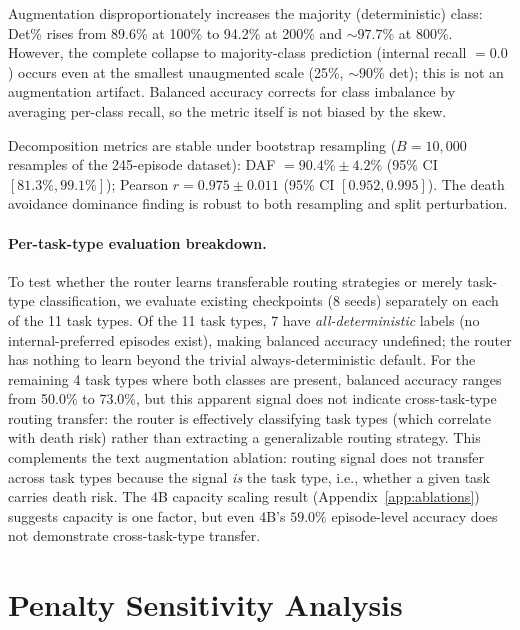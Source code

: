 \documentclass[11pt]{article}
\begin{document}
Augmentation disproportionately increases the majority (deterministic) class: Det\% rises from 89.6\% at 100\% to 94.2\% at 200\% and ${\sim}97.7\%$ at 800\%. However, the complete collapse to majority-class prediction (internal recall $= 0.0$) occurs even at the smallest unaugmented scale (25\%, ${\sim}90\%$ det); this is not an augmentation artifact. Balanced accuracy corrects for class imbalance by averaging per-class recall, so the metric itself is not biased by the skew.

Decomposition metrics are stable under bootstrap resampling ($B{=}10{,}000$ resamples of the 245-episode dataset): DAF $= 90.4\% \pm 4.2\%$ (95\% CI $[81.3\%, 99.1\%]$); Pearson $r = 0.975 \pm 0.011$ (95\% CI $[0.952, 0.995]$). The death avoidance dominance finding is robust to both resampling and split perturbation.

\paragraph{Per-task-type evaluation breakdown.} To test whether the router learns transferable routing strategies or merely task-type classification, we evaluate existing checkpoints (8 seeds) separately on each of the 11 task types. Of the 11 task types, 7 have \emph{all-deterministic} labels (no internal-preferred episodes exist), making balanced accuracy undefined; the router has nothing to learn beyond the trivial always-deterministic default. For the remaining 4 task types where both classes are present, balanced accuracy ranges from 50.0\% to 73.0\%, but this apparent signal does not indicate cross-task-type routing transfer: the router is effectively classifying task types (which correlate with death risk) rather than extracting a generalizable routing strategy. This complements the text augmentation ablation: routing signal does not transfer across task types because the signal \emph{is} the task type, i.e., whether a given task carries death risk. The 4B capacity scaling result (Appendix~\ref{app:ablations}) suggests capacity is one factor, but even 4B's $59.0\%$ episode-level accuracy does not demonstrate cross-task-type transfer.

\section{Penalty Sensitivity Analysis}
\label{app:penalty}
\end{document}

